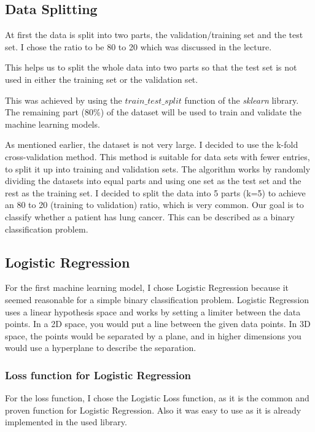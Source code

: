 \documentclass[a4paper,12pt]{article}
\begin{document}
\subsection{Data Splitting}
\label{sec:org5795d5c}
At first the data is split into two parts, the validation/training set and the test set. I chose the ratio to be 80 to 20 which was discussed in the lecture.

This helps us to split the whole data into two parts so that the test set is not used in either the training set or the validation set.

This was achieved by using the \(train\_test\_split\) function of the \emph{sklearn} library.
The remaining part (80\%) of the dataset will be used to train and validate the machine learning models.

As mentioned earlier, the dataset is not very large.
I decided to use the k-fold cross-validation method.
This method is suitable for data sets with fewer entries, to split it up into training and validation sets.
The algorithm works by randomly dividing the datasets into equal parts and using one set as the test set and the rest as the training set.
I decided to split the data into 5 parts (k=5) to achieve an 80 to 20 (training to validation) ratio, which is very common.
Our goal is to classify whether a patient has lung cancer. This can be described as a binary classification problem.

\subsection{Logistic Regression}
\label{sec:org1f9fc4a}
For the first machine learning model, I chose Logistic Regression because it seemed reasonable for a simple binary classification problem.
Logistic Regression uses a linear hypothesis space and works by setting a limiter between the data points.
In a 2D space, you would put a line between the given data points. In 3D space, the points would be separated by a plane, and in higher dimensions you would use a hyperplane to describe the separation.

\subsubsection{Loss function for Logistic Regression}
\label{sec:orgea333a3}
For the loss function, I chose the Logistic Loss function, as it is the common and proven function for Logistic Regression. Also it was easy to use as it is already implemented in the used library.
\end{document}
